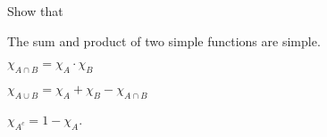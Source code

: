 \documentclass{../homework}
\begin{document}
\begin{problems}
  \begin{solution}
    \begin{problems}
    \item
    \item
    \item
    \item
    \end{problems}
  \end{solution}

\item Show that
  \begin{problems}
  \item The sum and product of two simple functions are simple.
  \item \(\chi_{A \cap B} = \chi_A \cdot \chi_B\)
  \item \(\chi_{A \cup B} = \chi_A + \chi_B - \chi_{A \cap B}\)
  \item \(\chi_{A^c} = 1 - \chi_A\).
  \end{problems}

  \begin{solution}
    \begin{problems}
    \item
    \item
    \item
    \item
    \end{problems}
  \end{solution}

\end{problems}
\end{document}
